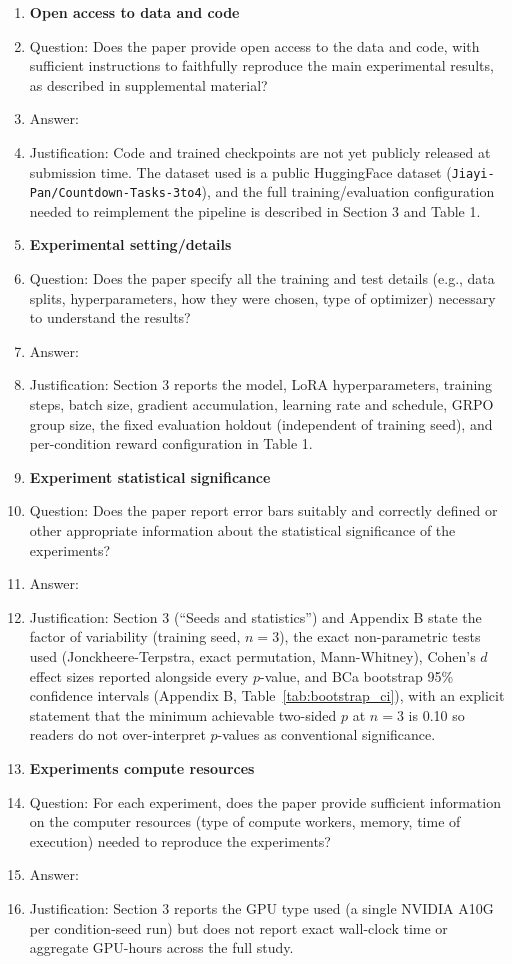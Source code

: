 \begin{enumerate}
\item {\bf Open access to data and code}
    \item[] Question: Does the paper provide open access to the data and code, with sufficient instructions to faithfully reproduce the main experimental results, as described in supplemental material?
    \item[] Answer: \answerNo{}
    \item[] Justification: Code and trained checkpoints are not yet publicly released at submission time. The dataset used is a public HuggingFace dataset (\texttt{Jiayi-Pan/Countdown-Tasks-3to4}), and the full training/evaluation configuration needed to reimplement the pipeline is described in Section 3 and Table 1.

\item {\bf Experimental setting/details}
    \item[] Question: Does the paper specify all the training and test details (e.g., data splits, hyperparameters, how they were chosen, type of optimizer) necessary to understand the results?
    \item[] Answer: \answerYes{}
    \item[] Justification: Section 3 reports the model, LoRA hyperparameters, training steps, batch size, gradient accumulation, learning rate and schedule, GRPO group size, the fixed evaluation holdout (independent of training seed), and per-condition reward configuration in Table 1.

\item {\bf Experiment statistical significance}
    \item[] Question: Does the paper report error bars suitably and correctly defined or other appropriate information about the statistical significance of the experiments?
    \item[] Answer: \answerYes{}
    \item[] Justification: Section 3 (``Seeds and statistics'') and Appendix B state the factor of variability (training seed, $n=3$), the exact non-parametric tests used (Jonckheere-Terpstra, exact permutation, Mann-Whitney), Cohen's $d$ effect sizes reported alongside every $p$-value, and BCa bootstrap 95\% confidence intervals (Appendix B, Table~\ref{tab:bootstrap_ci}), with an explicit statement that the minimum achievable two-sided $p$ at $n=3$ is 0.10 so readers do not over-interpret $p$-values as conventional significance.

\item {\bf Experiments compute resources}
    \item[] Question: For each experiment, does the paper provide sufficient information on the computer resources (type of compute workers, memory, time of execution) needed to reproduce the experiments?
    \item[] Answer: \answerNo{}
    \item[] Justification: Section 3 reports the GPU type used (a single NVIDIA A10G per condition-seed run) but does not report exact wall-clock time or aggregate GPU-hours across the full study.


\end{enumerate}
